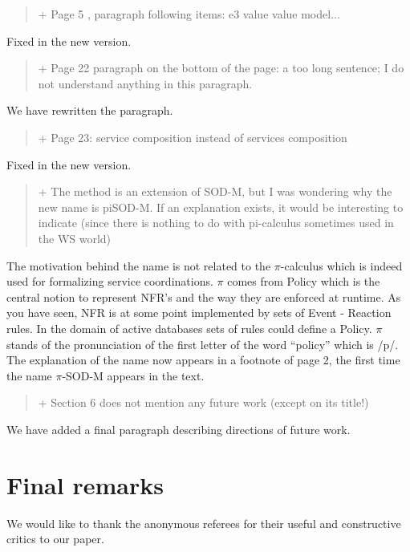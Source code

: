 \documentclass[12pt,a4wide]{article}
\begin{document}
\begin{quotation}\sf\footnotesize

+ Page 5 , paragraph following items: e3 value value model... 
\end{quotation}

\noindent 
Fixed in the new version.

\begin{quotation}\sf\footnotesize

+ Page 22 paragraph on the bottom of the page: a too long sentence; I do not understand anything in this paragraph. 
\end{quotation}

\noindent 
We have rewritten the paragraph.

\begin{quotation}\sf\footnotesize

+ Page 23: service composition instead of services composition 
\end{quotation}

\noindent 
Fixed in the new version.


\begin{quotation}\sf\footnotesize

+ The method is an extension of SOD-M, but I was wondering why the new name is piSOD-M. If an explanation exists, it would be interesting to indicate (since there is nothing to do with pi-calculus sometimes used in the WS world) 
\end{quotation}

\noindent 
The motivation behind the name is not related to the $\pi$-calculus which is indeed used for formalizing service coordinations. 
$\pi$ comes from Policy which is the central notion to represent  NFR's and the way they are enforced at runtime. As you have seen, NFR is at some point implemented by sets of Event - Reaction rules. In the domain of active databases sets of rules could define a Policy. $\pi$ stands of the pronunciation of the first letter of the word ``policy'' which is /p/. The explanation of the name now appears in a footnote of page 2, the first time the name $\pi$-SOD-M appears in the text. 


\begin{quotation}\sf\footnotesize

+ Section 6 does not mention any future work (except on its title!) 

\end{quotation}

\noindent 
We have added a final paragraph describing directions of future work.



\section*{Final remarks}

We would like to thank the anonymous referees for their useful and constructive critics to our paper.


  
\end{document}
